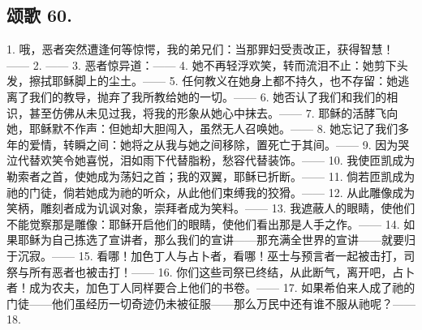 
\subsection{颂歌 60.}

1. 哦，恶者突然遭逢何等惊愕，我的弟兄们：当那罪妇受责改正，获得智慧！—\newline{}— 2. —\newline{}— 3. 恶者惊异道：—\newline{}— 4. 她不再轻浮欢笑，转而流泪不止：她剪下头发，擦拭耶稣脚上的尘土。—\newline{}— 5. 任何教义在她身上都不持久，也不存留：她逃离了我们的教导，抛弃了我所教给她的一切。—\newline{}— 6. 她否认了我们和我们的相识，甚至仿佛从未见过我，将我的形象从她心中抹去。—\newline{}— 7. 耶稣的活酵飞向她，耶稣默不作声：但她却大胆闯入，虽然无人召唤她。—\newline{}— 8. 她忘记了我们多年的爱情，转瞬之间：她将之从我与她之间移除，置死亡于其间。—\newline{}— 9. 因为哭泣代替欢笑令她喜悦，泪如雨下代替脂粉，愁容代替装饰。—\newline{}— 10. 我使匝凯成为勒索者之首，使她成为荡妇之首；我的双翼，耶稣已折断。—\newline{}— 11. 倘若匝凯成为祂的门徒，倘若她成为祂的听众，从此他们束缚我的狡猾。—\newline{}— 12. 从此雕像成为笑柄，雕刻者成为讥讽对象，崇拜者成为笑料。—\newline{}— 13. 我遮蔽人的眼睛，使他们不能觉察那是雕像：耶稣开启他们的眼睛，使他们看出那是人手之作。—\newline{}— 14. 如果耶稣为自己拣选了宣讲者，那么我们的宣讲——那充满全世界的宣讲——就要归于沉寂。—\newline{}— 15. 看哪！加色丁人与占卜者，看哪！巫士与预言者一起被击打，司祭与所有恶者也被击打！—\newline{}— 16. 你们这些司祭已终结，从此断气，离开吧，占卜者！成为农夫，加色丁人同样要合上他们的书卷。—\newline{}— 17. 如果希伯来人成了祂的门徒——他们虽经历一切奇迹仍未被征服——那么万民中还有谁不服从祂呢？—\newline{}— 18. 